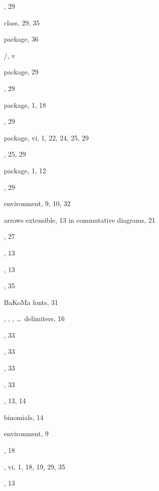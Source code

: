 \documentclass[leqno,titlepage,openany]{amsldoc}
\begin{document}
\begin{theindex}
  \item {}, 29
  \item {} class, 29, 35
  \item {} package, 36
  \item \amstex/, v
  \item {} package, 29
  \item {}, 29
  \item {} package, 1, 18
  \item {}, 29
  \item {} package, vi, 1, 22, 24, 25, 29
  \item {}, 25, 29
  \item {} package, 1, 12
  \item {}, 29
  \item {} environment, 9, 10, 32
  \item arrows
    \subitem extensible, 13
    \subitem in commutative diagrams, 21
  \item {}, 27
  \item {}, 13
  \item {}, 13
  \item {}, 35

  \indexspace

  \item BaKoMa fonts, 31
  \item {}, , , \dots\ delimiters, 16
  \item {}, 33
  \item {}, 33
  \item {}, 33
  \item {}, 33
  \item {}, 13, 14
  \item binomials, 14
  \item {} environment, 9
  \item {}, 18
  \item {}, vi, 1, 18, 19, 29, 35
  \item {}, 13

  \indexspace


\end{theindex}
\end{document}
